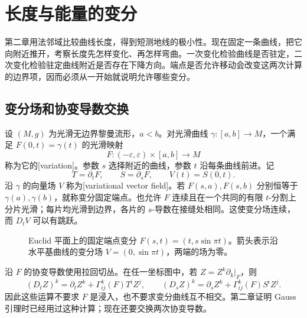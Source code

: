 
% 
% 

\section{长度与能量的变分}
\label{g3:sec:0601}

第二章用法邻域比较曲线长度，得到短测地线的极小性。现在固定一条曲线，把它向附近推开，考察长度先怎样变化、再怎样弯曲。一次变化检验曲线是否驻定，二次变化检验驻定曲线附近是否存在下降方向。端点是否允许移动会改变这两次计算的边界项，因而必须从一开始就说明允许哪些变分。

\subsection{变分场和协变导数交换}
\label{g3:subsec:0601:01}

设 \((M,g)\) 为光滑无边界黎曼流形，\(a<b\)。对光滑曲线 \(\gamma:[a,b]\to M\)，一个满足 \(F(0,t)=\gamma(t)\) 的光滑映射
\[
	F:(-\varepsilon,\varepsilon)\times[a,b]\longrightarrow M
\]
称为它的[variation]。参数 \(s\) 选择附近的曲线，参数 \(t\) 沿每条曲线前进。记
\[
	T=\partial_tF,\qquad S=\partial_sF,\qquad V(t)=S(0,t).
\]
沿 \(\gamma\) 的向量场 \(V\) 称为[variational vector field]。若 \(F(s,a),F(s,b)\) 分别恒等于 \(\gamma(a),\gamma(b)\)，就称变分固定端点。也允许 \(F\) 连续且在一个共同的有限 \(t\)-分割上分片光滑；每片均光滑到边界，各片的 \(s\)-导数在接缝处相同。这使变分场连续，而 \(D_tV\) 可以有跳跃。

\begin{figure}[htbp]
	\centering
	
	\caption{Euclid 平面上的固定端点变分 \(F(s,t)=(t,s\sin\pi t)\)。箭头表示沿水平基曲线的变分场 \(V=(0,\sin\pi t)\)，两端的场为零。}
	\label{g3:fig:fixed-endpoint-variation}
\end{figure}

沿 \(F\) 的协变导数使用拉回切丛。在任一坐标图中，若 \(Z=Z^k\partial_k|_F\)，则
\[
	(D_tZ)^k=\partial_tZ^k+\Gamma^k_{ij}(F)T^iZ^j,
	\qquad (D_sZ)^k=\partial_sZ^k+\Gamma^k_{ij}(F)S^iZ^j.
\]
因此这些运算不要求 \(F\) 是浸入，也不要求变分曲线互不相交。第二章证明 Gauss 引理时已经用过这种计算；现在还要交换两次协变导数。


